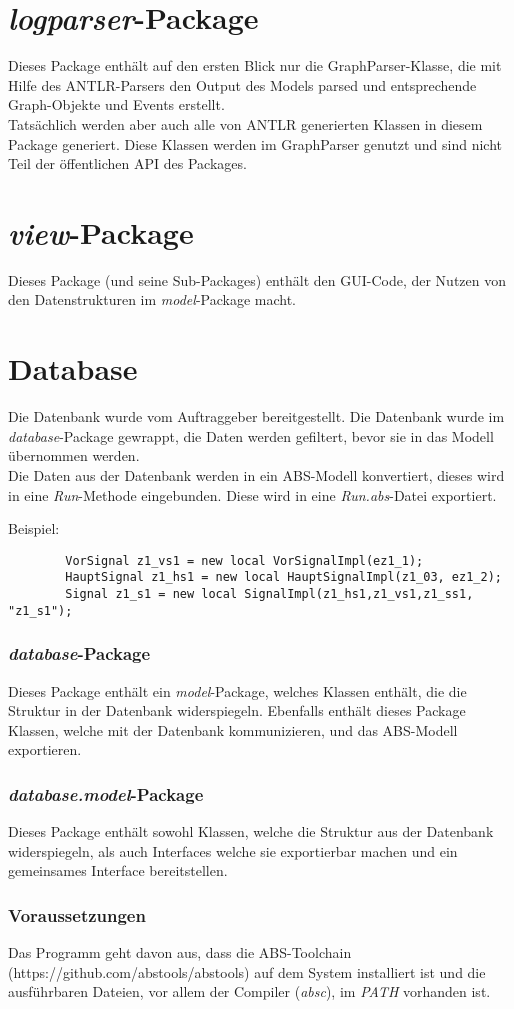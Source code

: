 \documentclass[accentcolor=tud0b,12pt,paper=a4]{tudreport}
\begin{document}
	\chapter{\textit{logparser}-Package}
	\label{logparser}
	Dieses Package enthält auf den ersten Blick nur die GraphParser-Klasse, die mit Hilfe des ANTLR-Parsers den Output des Models parsed und entsprechende Graph-Objekte und Events erstellt.\\
	Tatsächlich werden aber auch alle von ANTLR generierten Klassen in diesem Package generiert. Diese Klassen werden im GraphParser genutzt und sind nicht Teil der öffentlichen API des Packages.
		
	\chapter{\textit{view}-Package}
	Dieses Package (und seine Sub-Packages) enthält den GUI-Code, der Nutzen von den Datenstrukturen im \textit{model}-Package macht.
	
	\chapter{Database}
	\label{database}
		Die Datenbank wurde vom Auftraggeber bereitgestellt. Die Datenbank wurde im \textit{database}-Package gewrappt, die Daten werden gefiltert, bevor sie in das Modell übernommen werden.\\
		Die Daten aus der Datenbank werden in ein ABS-Modell konvertiert, dieses wird in eine \textit{Run}-Methode eingebunden. Diese wird in eine \textit{Run.abs}-Datei exportiert.
		
		Beispiel:\\
		\begin{lstlisting}
		VorSignal z1_vs1 = new local VorSignalImpl(ez1_1);
		HauptSignal z1_hs1 = new local HauptSignalImpl(z1_03, ez1_2);	
		Signal z1_s1 = new local SignalImpl(z1_hs1,z1_vs1,z1_ss1, "z1_s1");
		\end{lstlisting}
		\subsection{\textit{database}-Package}
		Dieses Package enthält ein \textit{model}-Package, welches Klassen enthält, die die Struktur in der Datenbank widerspiegeln. Ebenfalls enthält dieses Package Klassen, welche mit der Datenbank kommunizieren, und das ABS-Modell exportieren.
		\subsection{\textit{database.model}-Package}
		Dieses Package enthält sowohl Klassen, welche die Struktur aus der Datenbank widerspiegeln, als auch Interfaces welche sie exportierbar machen und ein gemeinsames Interface bereitstellen.
		\subsection{Voraussetzungen}
		Das Programm geht davon aus, dass die ABS-Toolchain (https://github.com/abstools/abstools) auf dem System installiert ist und die ausführbaren Dateien, vor allem der Compiler (\textit{absc}), im \textit{PATH} vorhanden ist.
	
\end{document}
